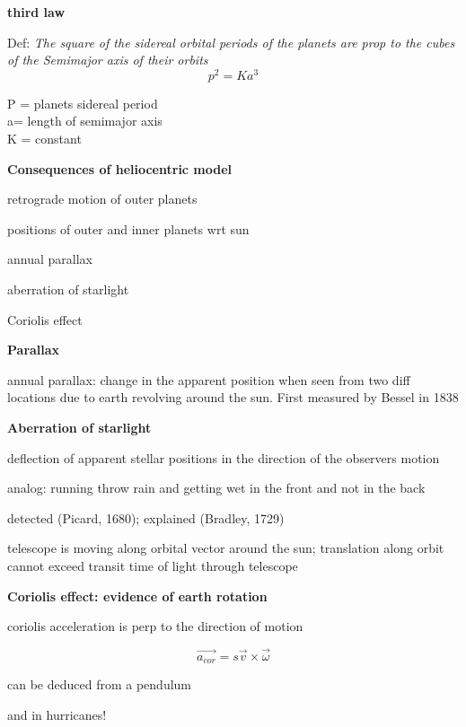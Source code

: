 \documentclass{article}
\begin{document}
\noindent \textbf{third law }

Def: \textit{The square of the sidereal orbital periods of the planets are prop to the cubes of the Semimajor axis of their orbits}
\[p^2 = Ka^3\]
\begin{center}
    P = planets sidereal period\\
    a= length of semimajor axis\\
    K = constant
\end{center}

\noindent \textbf{\large Consequences of heliocentric model}
\begin{list}{-}{}
\item retrograde motion of outer planets
\item positions of outer and inner planets wrt sun
\item annual parallax 
\item aberration of starlight
\item Coriolis effect
\end{list}

\noindent \textbf{\large Parallax}
\begin{list}{-}{}
\item annual parallax: change in the apparent position when seen from two diff locations due to earth revolving around the sun. First measured by Bessel in 1838
\end{list}

\noindent \textbf{\large Aberration of starlight}
\begin{list}{-}{}
\item deflection of apparent stellar positions in the direction of the observers motion
\item analog: running throw rain and getting wet in the front and not in the back
\item detected (Picard, 1680); explained (Bradley, 1729)
\item telescope is moving along orbital vector around the sun; translation along orbit cannot exceed transit time of light through telescope
\end{list}

\noindent \textbf{\large Coriolis effect: evidence of earth rotation}
\begin{list}{-}{}
\item coriolis acceleration is perp to the direction of motion 
\item \[\vec{a_{cor}}= s\vec{v} \times \vec{\omega}\]
\item can be deduced from a pendulum
\item and in hurricanes!
\end{list}
\end{document}
